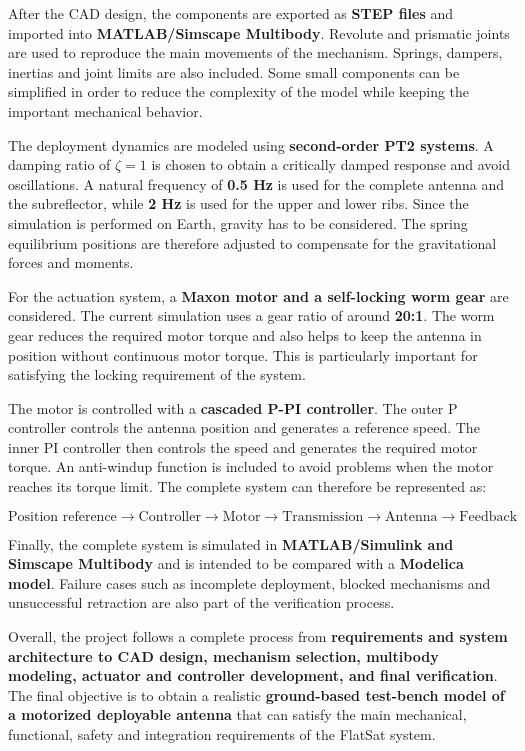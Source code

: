 After the CAD design, the components are exported as \textbf{STEP files} and imported into \textbf{MATLAB/Simscape Multibody}. Revolute and prismatic joints are used to reproduce the main movements of the mechanism. Springs, dampers, inertias and joint limits are also included. Some small components can be simplified in order to reduce the complexity of the model while keeping the important mechanical behavior.

The deployment dynamics are modeled using \textbf{second-order PT2 systems}. A damping ratio of $\zeta=1$ is chosen to obtain a critically damped response and avoid oscillations. A natural frequency of \textbf{0.5 Hz} is used for the complete antenna and the subreflector, while \textbf{2 Hz} is used for the upper and lower ribs. Since the simulation is performed on Earth, gravity has to be considered. The spring equilibrium positions are therefore adjusted to compensate for the gravitational forces and moments.

For the actuation system, a \textbf{Maxon motor and a self-locking worm gear} are considered. The current simulation uses a gear ratio of around \textbf{20:1}. The worm gear reduces the required motor torque and also helps to keep the antenna in position without continuous motor torque. This is particularly important for satisfying the locking requirement of the system.

The motor is controlled with a \textbf{cascaded P-PI controller}. The outer P controller controls the antenna position and generates a reference speed. The inner PI controller then controls the speed and generates the required motor torque. An anti-windup function is included to avoid problems when the motor reaches its torque limit. The complete system can therefore be represented as:

\[
\boxed{
\text{Position reference}
\rightarrow
\text{Controller}
\rightarrow
\text{Motor}
\rightarrow
\text{Transmission}
\rightarrow
\text{Antenna}
\rightarrow
\text{Feedback}
}
\]

Finally, the complete system is simulated in \textbf{MATLAB/Simulink and Simscape Multibody} and is intended to be compared with a \textbf{Modelica model}. Failure cases such as incomplete deployment, blocked mechanisms and unsuccessful retraction are also part of the verification process.

Overall, the project follows a complete process from \textbf{requirements and system architecture to CAD design, mechanism selection, multibody modeling, actuator and controller development, and final verification}. The final objective is to obtain a realistic \textbf{ground-based test-bench model of a motorized deployable antenna} that can satisfy the main mechanical, functional, safety and integration requirements of the FlatSat system.
